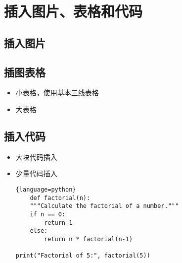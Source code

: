 
\chapter{插入图片、表格和代码}
\section{插入图片}

\section{插图表格}
\begin{itemize}
    \item 小表格，使用基本三线表格

    \item 大表格
\end{itemize}
\section{插入代码}
\begin{itemize}
    \item 大块代码插入
    
    \item 少量代码插入
    \begin{lstlisting}{language=python}
    def factorial(n):
    """Calculate the factorial of a number."""
    if n == 0:
        return 1
    else:
        return n * factorial(n-1)

print("Factorial of 5:", factorial(5))
\end{lstlisting}
\end{itemize}



